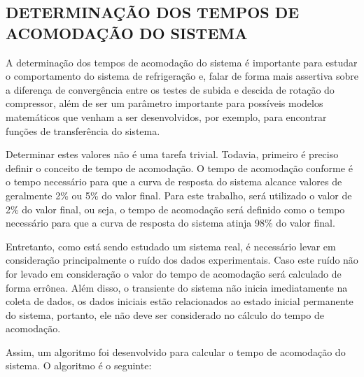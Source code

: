 \subsection{\MakeUppercase{Determinação dos Tempos de Acomodação do Sistema}} \label{subsec:Tempo de Acomodação do Sistema}

A determinação dos tempos de acomodação do sistema é importante para estudar o comportamento do sistema de refrigeração e, falar
 de forma mais assertiva sobre a diferença de convergência entre os testes de subida e descida de rotação do compressor, além de ser um parâmetro importante para possíveis modelos matemáticos que venham a ser desenvolvidos, por exemplo, para encontrar funções de transferência do sistema. 

Determinar estes valores não é uma tarefa trivial. Todavia, primeiro é preciso definir o conceito de tempo de acomodação. O tempo de acomodação conforme \textcite{ogataControle} é o tempo necessário para que a curva de resposta do sistema alcance valores de geralmente 2\% ou 5\% do valor final. Para este trabalho, será utilizado o valor de 2\% do valor final, ou seja, o tempo de acomodação será definido como o tempo necessário para que a curva de resposta do sistema atinja 98\% do valor final.

Entretanto, como está sendo estudado um sistema real, é necessário levar em consideração principalmente o ruído dos dados experimentais. Caso este ruído não for levado em consideração o valor do tempo de acomodação será calculado de forma errônea. Além disso, o transiente do sistema não inicia imediatamente na coleta de dados, os dados iniciais estão relacionados ao estado inicial permanente do sistema, portanto, ele não deve ser considerado no cálculo do tempo de acomodação. 

Assim, um algoritmo foi desenvolvido para calcular o tempo de acomodação do sistema. O algoritmo é o seguinte:

